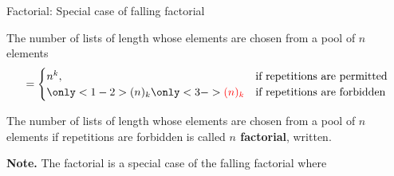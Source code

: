 \documentclass[10pt]{beamer}
\begin{document}
\begin{frame}{Factorial: Special case of falling factorial}

\begin{mygreenbox}[title= Theorem 8.6 from Scheinerman]
The number of lists of length  whose elements are chosen from a pool of $n$ elements 
%
\begin{align*}
= \begin{cases}
 n^k, & \text{if repetitions are permitted} \\
 \only<1-2>{(n)_k} \only<3->{\red{(n)_k}} & \text{if repetitions are forbidden}
 \end{cases}
\end{align*}
\end{mygreenbox}

\vfill 

\begin{mygreenbox}[title=Definition (from Scheinerman Sec. 9)]
The number of lists of length  whose elements are chosen from a pool of  $n$ elements if repetitions are forbidden is called \textbf{$n$ factorial}, written.   
\end{mygreenbox}
\vfill 
\pause 
\colorbox{red!30}{\textbf{Note.}} The factorial is a special case of the falling factorial where  
\end{frame}
\end{document}
